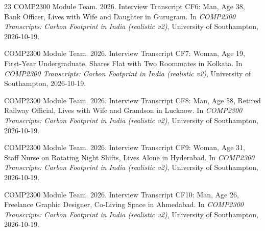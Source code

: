 \documentclass[12pt, a4paper]{article}
\begin{document}
\begin{thebibliography}{23}
COMP2300 Module Team. 2026. Interview Transcript CF6: Man, Age 38, Bank Officer, Lives with Wife and Daughter in Gurugram. In \textit{COMP2300 Transcripts: Carbon Footprint in India (realistic v2)}, University of Southampton, 2026-10-19.

COMP2300 Module Team. 2026. Interview Transcript CF7: Woman, Age 19, First-Year Undergraduate, Shares Flat with Two Roommates in Kolkata. In \textit{COMP2300 Transcripts: Carbon Footprint in India (realistic v2)}, University of Southampton, 2026-10-19.

COMP2300 Module Team. 2026. Interview Transcript CF8: Man, Age 58, Retired Railway Official, Lives with Wife and Grandson in Lucknow. In \textit{COMP2300 Transcripts: Carbon Footprint in India (realistic v2)}, University of Southampton, 2026-10-19.

COMP2300 Module Team. 2026. Interview Transcript CF9: Woman, Age 31, Staff Nurse on Rotating Night Shifts, Lives Alone in Hyderabad. In \textit{COMP2300 Transcripts: Carbon Footprint in India (realistic v2)}, University of Southampton, 2026-10-19.

COMP2300 Module Team. 2026. Interview Transcript CF10: Man, Age 26, Freelance Graphic Designer, Co-Living Space in Ahmedabad. In \textit{COMP2300 Transcripts: Carbon Footprint in India (realistic v2)}, University of Southampton, 2026-10-19.

\end{thebibliography}
\end{document}
